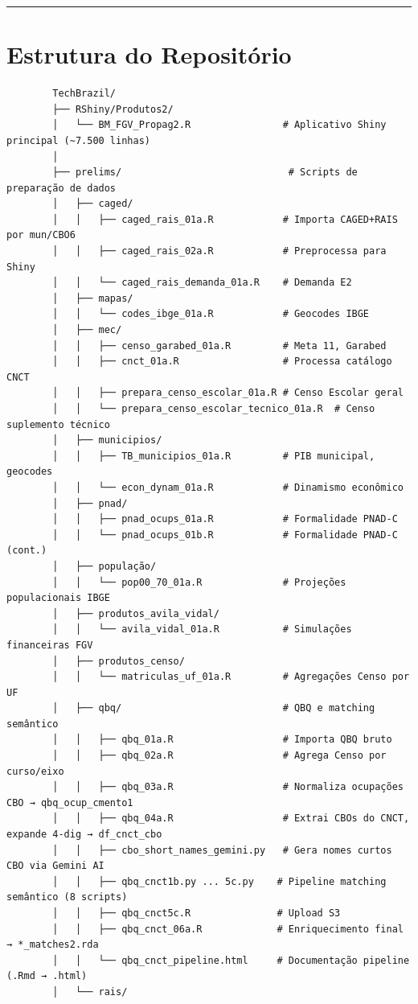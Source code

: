 \documentclass[10pt]{article}
\begin{document}
	\vspace{1em}
	\hrule
	\vspace{1em}
	
	\section*{Estrutura do Repositório}
	
	\begin{verbatim}
		TechBrazil/
		├── RShiny/Produtos2/
		│   └── BM_FGV_Propag2.R                # Aplicativo Shiny principal (~7.500 linhas)
		│
		├── prelims/                             # Scripts de preparação de dados
		│   ├── caged/
		│   │   ├── caged_rais_01a.R            # Importa CAGED+RAIS por mun/CBO6
		│   │   ├── caged_rais_02a.R            # Preprocessa para Shiny
		│   │   └── caged_rais_demanda_01a.R    # Demanda E2
		│   ├── mapas/
		│   │   └── codes_ibge_01a.R            # Geocodes IBGE
		│   ├── mec/
		│   │   ├── censo_garabed_01a.R         # Meta 11, Garabed
		│   │   ├── cnct_01a.R                  # Processa catálogo CNCT
		│   │   ├── prepara_censo_escolar_01a.R # Censo Escolar geral
		│   │   └── prepara_censo_escolar_tecnico_01a.R  # Censo suplemento técnico
		│   ├── municipios/
		│   │   ├── TB_municipios_01a.R         # PIB municipal, geocodes
		│   │   └── econ_dynam_01a.R            # Dinamismo econômico
		│   ├── pnad/
		│   │   ├── pnad_ocups_01a.R            # Formalidade PNAD-C
		│   │   └── pnad_ocups_01b.R            # Formalidade PNAD-C (cont.)
		│   ├── população/
		│   │   └── pop00_70_01a.R              # Projeções populacionais IBGE
		│   ├── produtos_avila_vidal/
		│   │   └── avila_vidal_01a.R           # Simulações financeiras FGV
		│   ├── produtos_censo/
		│   │   └── matriculas_uf_01a.R         # Agregações Censo por UF
		│   ├── qbq/                            # QBQ e matching semântico
		│   │   ├── qbq_01a.R                   # Importa QBQ bruto
		│   │   ├── qbq_02a.R                   # Agrega Censo por curso/eixo
		│   │   ├── qbq_03a.R                   # Normaliza ocupações CBO → qbq_ocup_cmento1
		│   │   ├── qbq_04a.R                   # Extrai CBOs do CNCT, expande 4-dig → df_cnct_cbo
		│   │   ├── cbo_short_names_gemini.py   # Gera nomes curtos CBO via Gemini AI
		│   │   ├── qbq_cnct1b.py ... 5c.py    # Pipeline matching semântico (8 scripts)
		│   │   ├── qbq_cnct5c.R               # Upload S3
		│   │   ├── qbq_cnct_06a.R             # Enriquecimento final → *_matches2.rda
		│   │   └── qbq_cnct_pipeline.html     # Documentação pipeline (.Rmd → .html)
		│   └── rais/

\end{verbatim}
\end{document}

